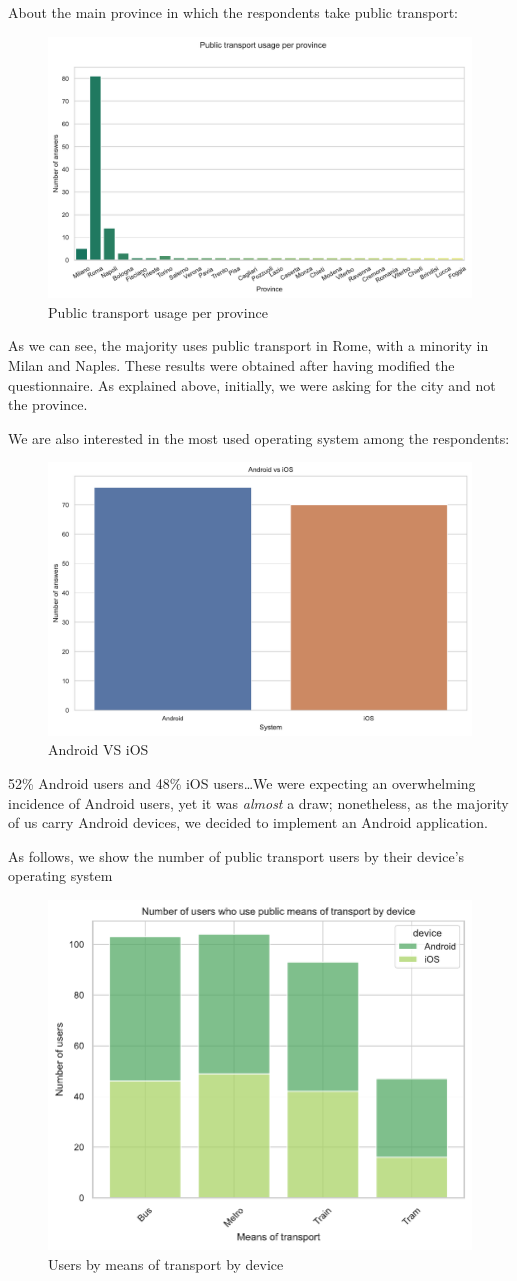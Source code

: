 \documentclass[a4paper, 11pt]{report}
\begin{document}
About the main province in which the respondents take public transport:
\begin{figure}[H]
	\centering
	\includegraphics[width=.8\textwidth]{img/analysis/public_transport_usage_per_province.pdf}
	\caption{Public transport usage per province}
\end{figure}
As we can see, the majority uses public transport in Rome, with a minority in Milan and Naples. These results were obtained after having modified
the questionnaire. As explained above, initially, we were asking for the city and not the province.

We are also interested in the most used operating system among the respondents:
\begin{figure}[H]
	\centering
	\includegraphics[width=.5\textwidth]{img/analysis/android_v_ios.pdf}
	\caption{Android VS iOS}
\end{figure}

52\% Android users and 48\% iOS users\dots We were expecting an overwhelming incidence of Android users, yet it was \emph{almost} a draw; nonetheless, as the majority of us carry Android devices, we decided to implement an Android application.

As follows, we show the number of public transport users by their device's operating system
\begin{figure}[H]
	\centering
	\includegraphics[width=.5\textwidth]{img/analysis/users_by_means_of_transport_by_device.pdf}
	\caption{Users by means of transport by device}
\end{figure}
\end{document}
